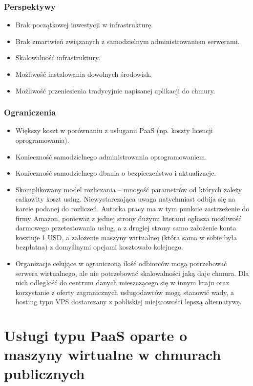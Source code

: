 \documentclass[12pt,a4paper,twoside,titlepage,openright]{book}
\begin{document}
\subsubsection{Perspektywy}
\begin{itemize}
\item Brak początkowej inwestycji w infrastrukturę.
\item Brak zmartwień związanych z samodzielnym administrowaniem serwerami.
\item Skalowalność infrastruktury.
\item Możliwość instalowania dowolnych środowisk.
\item Możliwość przeniesienia tradycyjnie napisanej aplikacji do chmury.
\end{itemize}

\subsubsection{Ograniczenia}
\begin{itemize}
\item Większy koszt w porównaniu z usługami PaaS (np. koszty licencji oprogramowania).
\item Konieczność samodzielnego administrowania oprogramowaniem.
\item Konieczność samodzielnego dbania o bezpieczeństwo i aktualizacje.
\item Skomplikowany model rozliczania -- mnogość parametrów od których zależy całkowity koszt usług. Niewystarczająca uwaga natychmiast odbija się na karcie podanej do rozliczeń. Autorka pracy ma w tym punkcie zastrzeżenie do firmy Amazon, ponieważ z jednej strony dużymi literami ogłasza możliwość darmowego przetestowania usług, a z drugiej strony samo założenie konta kosztuje 1 USD, a założenie maszyny wirtualnej (która sama w sobie była bezpłatna) z domyślnymi opcjami kosztowało kolejnego. 
\item Organizacje celujące w ograniczoną ilość odbiorców mogą potrzebować serwera wirtualnego, ale nie potrzebować skalowalności jaką daje chmura. Dla nich odległość do centrum danych mieszczącego się w innym kraju oraz korzystanie z oferty zagranicznych usługodawców mogą stanowić wady, a hosting typu VPS dostarczany z pobliskiej miejscowości lepszą alternatywę.
\end{itemize}

\section{Usługi typu PaaS oparte o maszyny wirtualne w chmurach publicznych}\label{section:podejsciePaas}
\end{document}
